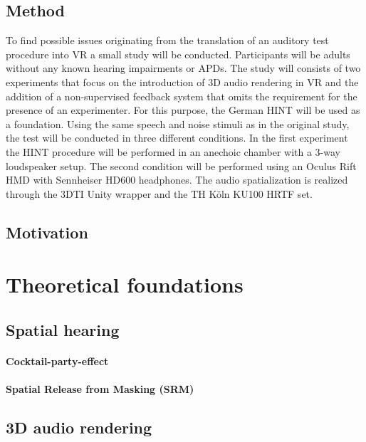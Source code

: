 \documentclass[a4paper,11pt]{article}%
\renewcommand{\\}{\vspace*{0.5\baselineskip} \newline}
\begin{document}
\subsection{Method}
To find possible issues originating from the translation of an auditory test procedure into \ac{VR} a small study will be conducted. Participants will be adults without any known hearing impairments or \ac{APD}s. The study will consists of two experiments that focus on the introduction of 3D audio rendering in \ac{VR} and the addition of a non-supervised feedback system that omits the requirement for the presence of an experimenter.
\newline
\newline
For this purpose, the German \ac{HINT} will be used as a foundation. Using the same speech and noise stimuli as in the original study, the test will be conducted in three different conditions. In the first experiment the \ac{HINT} procedure will be performed in an anechoic chamber with a 3-way loudspeaker setup. The second condition will be performed using an Oculus Rift \ac{HMD} with Sennheiser HD600 headphones. The audio spatialization is realized through the \ac{3DTI} Unity wrapper and the TH Köln KU100 \ac{HRTF} set.


\subsection{Motivation}

\section{Theoretical foundations}

\subsection{Spatial hearing}

\paragraph{Cocktail-party-effect}

\paragraph{Spatial Release from Masking (SRM)}


\subsection{3D audio rendering}
\end{document}
